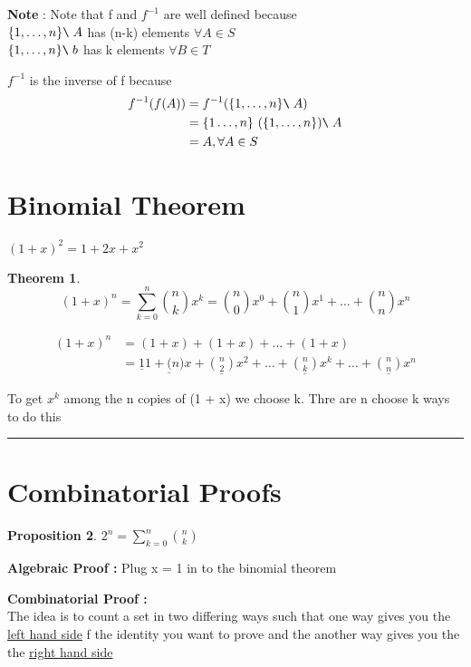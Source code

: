 \documentclass{article}
\newcounter{lecnum}
\newcommand{\bs}{
		\texttt{\char`\\ \hspace{0.1cm}} 
	}
\newtheorem{theorem}{Theorem}[lecnum]
\newtheorem{prop}[theorem]{Proposition}
\newenvironment{proof}{{\bf Proof:}}{\hfill\rule{2mm}{2mm}}
\begin{document}
\textbf{Note} : Note that f and \(f^{-1}\) are well defined because \\
\(\{1, \ldots, n\}  \bs A\) has (n-k) elements \(\forall A \in S\)\\
\(\{1, \ldots, n \}  \bs b \) has k elements \(\forall B \in T \)


\(f^{-1}\) is the inverse of f because 
\[\begin{aligned}
f^{-1} (f(A)) & = f^{-1}( \{1, \ldots , n \} \bs A ) \\
& = \{1 \ldots, n\} \ (\{1, \ldots, n\}) \bs  A \\
& = A , \forall A \in S
\end{aligned}\]


\section{Binomial Theorem}
\((1 + x )^2 = 1 + 2x + x^2\)
\begin{theorem}
\[(1 + x)^n = \sum_{k=0}^{n} {{n}\choose{k}}x^k = {n \choose 0} x^0 + {n \choose 1} x^1 + \ldots + {n \choose n } x^n\]
\end{theorem}

\begin{proof}
\[\begin{aligned}
(1 + x)^n   & = (1 + x) + (1 + x) + \ldots + (1 + x) \\
			& = \underline{1} 1 +  \underline(n) x + \underline{{n \choose 2}} x^2 + \ldots + \underline{{n \choose k}}x^k + \ldots + \underline{{n \choose n}} x^n 
\end{aligned}\]

To get \(x^k\) among the n copies of (1 + x) we choose k. Thre are n choose k ways to do this
\end{proof}

\section{Combinatorial Proofs}
\begin{prop}
\(2^n = \sum_{k = 0}^{n} {n \choose k}\)
\end{prop}

\textbf{Algebraic Proof : } Plug x = 1 in to the binomial theorem

\textbf{Combinatorial Proof : } \\
The idea is to count a set in two differing ways such that one way gives you the 
\underline{left hand side} f the identity you want to prove and the another way gives you the the \underline{right hand side}
\end{document}
